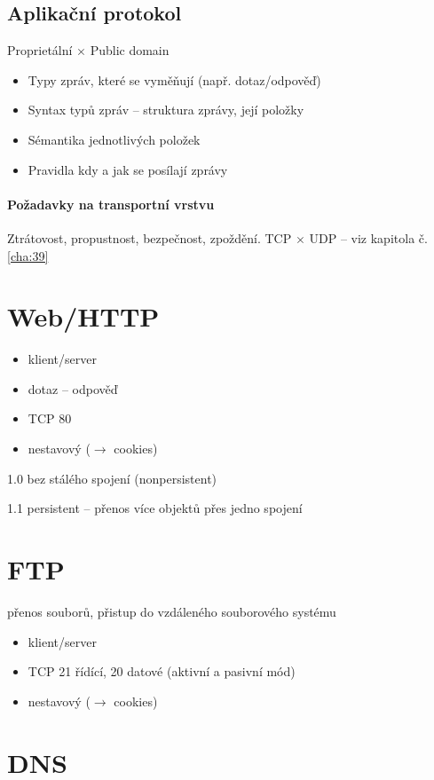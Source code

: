 \documentclass[a4wide]{report}
\begin{document}
\subsection{Aplikační protokol}
Proprietální $\times$ Public domain
\begin{itemize}
	\item Typy zpráv, které se vyměňují (např. dotaz/odpověď)
	\item Syntax typů zpráv -- struktura zprávy, její položky
	\item Sémantika jednotlivých položek
	\item Pravidla kdy a jak se posílají zprávy
\end{itemize}

\paragraph{Požadavky na transportní vrstvu} Ztrátovost, propustnost, bezpečnost, zpoždění. TCP $\times$ UDP -- viz kapitola č. \ref{cha:39}

\section{Web/HTTP}
\begin{itemize}
	\item klient/server
	\item dotaz -- odpověď
	\item TCP 80
	\item nestavový ($\to$ cookies)
\end{itemize}

1.0 bez stálého spojení (nonpersistent)

1.1 persistent -- přenos více objektů přes jedno spojení

\section{FTP}
přenos souborů, přistup do vzdáleného souborového systému

\begin{itemize}
	\item klient/server
	\item TCP 21 řídící, 20 datové (aktivní a pasivní mód)
	\item nestavový ($\to$ cookies)
\end{itemize}

\section{DNS}
\end{document}
